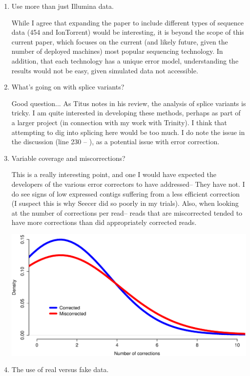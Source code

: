 \documentclass[11pt]{article}
\begin{document}
\begin{enumerate}
\item Use more than just Illumina data. 
\begin{addmargin}[2em]{2em}
While I agree that expanding the paper to include different types of sequence data (454 and IonTorrent) would be interesting, it is beyond the scope of this current paper, which focuses on the current (and likely future, given the number of deployed machines) most popular sequencing technology. In addition, that each technology has a unique error model, understanding the results would not be easy, given simulated data not accessible. 
\end{addmargin}

\item What's going on with splice variants? 
\begin{addmargin}[2em]{2em}
Good question... As Titus notes in his review, the analysis of splice variants is tricky. I am quite interested in developing these methods, perhaps as part of a larger project (in connection with my work with Trinity). I think that attempting to dig into splicing here would be too much. I do note the issue in the discussion (line 230 -- ), as a potential issue with error correction. 
\end{addmargin}


\item Variable coverage and miscorrections? 
\begin{addmargin}[2em]{2em}
This is a really interesting point, and one I would have expected the developers of the various error correctors to have addressed-- They have not. I do see signs of low expressed contigs suffering from a less efficient correction (I suspect this is why Seecer did so poorly in my trials). Also, when looking at the number of corrections per read-- reads that are miscorrected tended to have more corrections than did appropriately corrected reads.
\end{addmargin}
\centerline{\includegraphics[width=30.0\baselineskip]{FigX.eps}}

 



\item The use of real versus fake data. 
\begin{addmargin}[2em]{2em}
\end{addmargin}






\end{enumerate}
\end{document}
